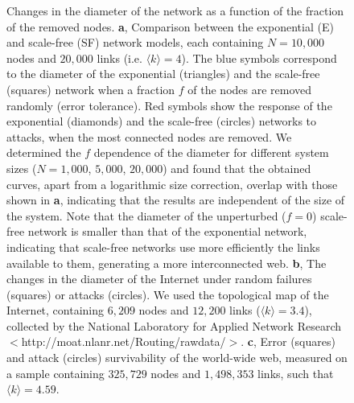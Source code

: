 \begin{figure}[h]
\hspace{0.6in}
\renewcommand\baselinestretch{0.90}
\vspace{-1in}
\caption{ Changes in the diameter of the network as a function of the fraction of the removed nodes. {\bf a}, Comparison  between the exponential (E) and scale-free (SF) network models, each containing $N=10,000$ nodes and $20,000$ links (i.e. $\langle k\rangle=4$). The blue symbols correspond to the diameter of the exponential (triangles) and the scale-free (squares) network when a fraction $f$ of the nodes are removed randomly (error tolerance). Red symbols show the response of the exponential (diamonds) and the scale-free (circles) networks to attacks, when the most connected nodes are removed. We determined the $f$ dependence of the diameter for different system sizes ($N=1,000$, $5,000$, $20,000$) and found that the obtained curves, apart from a logarithmic size correction, overlap with those shown in {\bf a}, indicating that the results are independent of the size of the system. 
Note that the diameter of the unperturbed ($f=0$) scale-free network is smaller than that of the exponential network, indicating that scale-free networks use more efficiently the links available to them, generating a more interconnected web. {\bf b}, The changes in the diameter of the Internet under random failures (squares) or attacks (circles). We used the topological map of the Internet, containing $6,209$ nodes and $12,200$ links ($\langle k\rangle=3.4$), collected by the National Laboratory for Applied Network Research $<$http://moat.nlanr.net/Routing/rawdata/$>$. {\bf c}, Error (squares) and attack (circles) survivability of the world-wide web, measured on a sample containing $325,729$ nodes and $1,498,353$ links\protect\cite{diam}, such that $\langle k\rangle=4.59$.}
\end{figure}

\newpage

